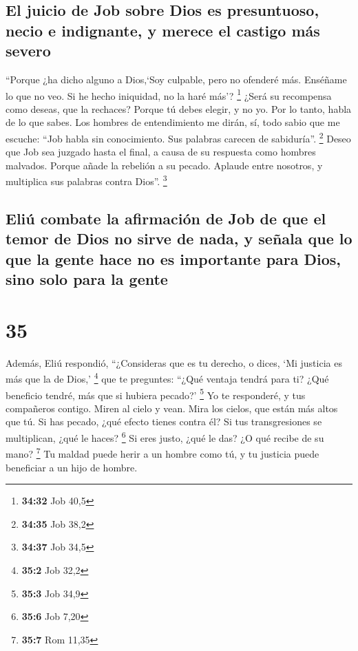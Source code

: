 \hypertarget{el-juicio-de-job-sobre-dios-es-presuntuoso-necio-e-indignante-y-merece-el-castigo-muxe1s-severo}{%
\subsection{El juicio de Job sobre Dios es presuntuoso, necio e
indignante, y merece el castigo más
severo}\label{el-juicio-de-job-sobre-dios-es-presuntuoso-necio-e-indignante-y-merece-el-castigo-muxe1s-severo}}

 ``Porque ¿ha dicho alguno a Dios,`Soy culpable, pero no
ofenderé más.  Enséñame lo que no veo. Si he hecho
iniquidad, no la haré más'? \footnote{\textbf{34:32} Job 40,5}
 ¿Será su recompensa como deseas, que la rechaces? Porque
tú debes elegir, y no yo. Por lo tanto, habla de lo que sabes.
 Los hombres de entendimiento me dirán, sí, todo sabio
que me escuche:  ``Job habla sin conocimiento. Sus
palabras carecen de sabiduría''. \footnote{\textbf{34:35} Job 38,2}
 Deseo que Job sea juzgado hasta el final, a causa de su
respuesta como hombres malvados.  Porque añade la
rebelión a su pecado. Aplaude entre nosotros, y multiplica sus palabras
contra Dios''. \footnote{\textbf{34:37} Job 34,5}

\hypertarget{eliuxfa-combate-la-afirmaciuxf3n-de-job-de-que-el-temor-de-dios-no-sirve-de-nada-y-seuxf1ala-que-lo-que-la-gente-hace-no-es-importante-para-dios-sino-solo-para-la-gente}{%
\subsection{Eliú combate la afirmación de Job de que el temor de Dios no
sirve de nada, y señala que lo que la gente hace no es importante para
Dios, sino solo para la
gente}\label{eliuxfa-combate-la-afirmaciuxf3n-de-job-de-que-el-temor-de-dios-no-sirve-de-nada-y-seuxf1ala-que-lo-que-la-gente-hace-no-es-importante-para-dios-sino-solo-para-la-gente}}

\hypertarget{section-34}{%
\section{35}\label{section-34}}

 Además, Eliú respondió,  ``¿Consideras que
es tu derecho, o dices, `Mi justicia es más que la de Dios,' \footnote{\textbf{35:2}
  Job 32,2}  que te preguntes: ``¿Qué ventaja tendrá para
ti? ¿Qué beneficio tendré, más que si hubiera pecado?' \footnote{\textbf{35:3}
  Job 34,9}  Yo te responderé, y tus compañeros contigo.
 Miren al cielo y vean. Mira los cielos, que están más
altos que tú.  Si has pecado, ¿qué efecto tienes contra
él? Si tus transgresiones se multiplican, ¿qué le haces? \footnote{\textbf{35:6}
  Job 7,20}  Si eres justo, ¿qué le das? ¿O qué recibe de
su mano? \footnote{\textbf{35:7} Rom 11,35}  Tu maldad
puede herir a un hombre como tú, y tu justicia puede beneficiar a un
hijo de hombre.


